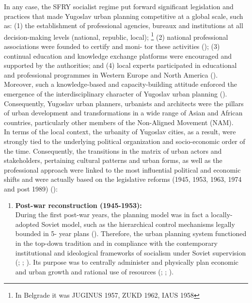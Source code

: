 \documentclass[11pt]{report}
\begin{document}
{{{{In any case, the SFRY socialist regime put forward significant legislation and practices that made Yugoslav urban planning competitive at a global scale, such as: (1) the establishment of professional agencies, bureaux and institutions at all decision-making levels (national, republic, local);
\footnote{In Belgrade it was JUGINUS 1957, ZUKD 1962, IAUS 1958}
(2) national professional associations were founded to certify and moni- tor these activities (\href{Bakic}{\citealt{bakic_prostorno_1988}}); (3) continual education and knowledge exchange platforms were encouraged and supported by the authorities; and (4) local experts participated in educational and professional programmes in Western Europe and North America (\href{Nedovic}{\citealt{nedovicbudic_waves_2006}}).
Moreover, such a knowledge-based and capacity-building attitude enforced the emergence of the interdisciplinary character of Yugoslav urban planning (\href{Cavric}{\citealt{cavric_perspectives_2000}}).
Consequently, Yugoslav urban planners, urbanists and architects were the pillars of urban development and transformations in a wide range of Asian and African countries, particularly other members of the Non-Aligned Movement (NAM).
\\

In terms of the local context, the urbanity of Yugoslav cities, as a result, were strongly tied to the underlying political organization and socio-economic order of the time. Consequently, the transitions in the matrix of urban actors and stakeholders, pertaining cultural patterns and urban forms, as well as the professional approach were linked to the most influential political and economic shifts and were actually based on the legislative reforms (1945, 1953, 1963, 1974 and post 1989) (\href{Pajovic}{\citealt{pajovic_pregled_2005}}):

\begin{enumerate}
\item \textbf{Post-war reconstruction (1945-1953):}
\\
During the first post-war years, the planning model was in fact a locally-adopted Soviet model, such as the hierarchical control mechanisms legally bounded in 5- year plans (\href{Vujosevic}{\citealt{vujosevic_planning_2006}}).
Therefore, the urban planning system functioned in the top-down tradition and in compliance with the contemporary institutional and ideological frameworks of socialism under Soviet supervision (\href{Dawson}{\citealt{dawson_yugoslavia_1987}}; \href{Papic}{\citealt{papic_z._stanje_1988}}; \href{Peric}{\citealt{peric_evolution_2016}}).
Its purpose was to centrally administer and physically plan economic and urban growth and rational use of resources (\href{Dawson}{\citealt{dawson_yugoslavia_1987}}; \href{Papic}{\citealt{papic_z._stanje_1988}}; \href{Vujosevic}{\citealt{vujosevic_planning_2006}}). 
\\


\end{enumerate}}}}}
\end{document}

